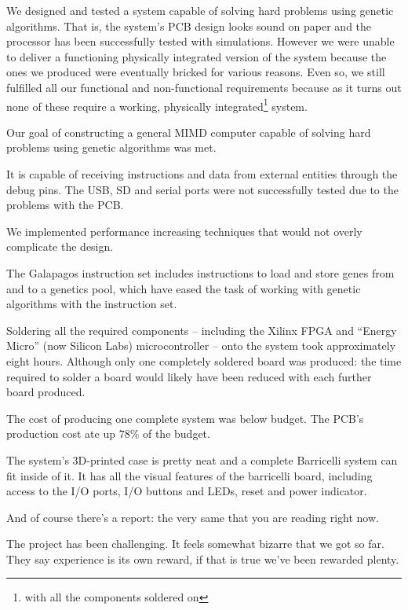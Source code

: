 We designed and tested a system capable of solving hard problems using genetic algorithms.
That is, the system's PCB design looks sound on paper and the processor has been successfully tested with simulations.
However we were unable to deliver a functioning physically integrated version of the system because the ones we produced were eventually bricked for various reasons.
Even so, we still fulfilled all our functional and non-functional requirements because as it turns out none of these require a working, physically integrated\footnote{with all the components soldered on} system.

Our goal of constructing a general MIMD computer capable of solving hard problems using genetic algorithms was met.

It is capable of receiving instructions and data from external entities through the debug pins.
The USB, SD and serial ports were not successfully tested due to the problems with the PCB.

We implemented performance increasing techniques that would not overly complicate the design.

The Galapagos instruction set includes instructions to load and store genes from and to a genetics pool, which have eased the task of working with genetic algorithms with the instruction set.

Soldering all the required components -- including the Xilinx FPGA and ``Energy Micro'' (now Silicon Labs) microcontroller --  onto the system took approximately eight hours.
Although only one completely soldered board was produced: the time required to solder a board would likely have been reduced with each further board produced.

The cost of producing one complete system was below budget.
The PCB's production cost ate up $78\%$ of the budget.

The system's 3D-printed case is pretty neat and a complete Barricelli system can fit inside of it. 
It has all the visual features of the barricelli board, including access to the I/O ports, I/O buttons and LEDs, reset and power indicator.

And of course there's a report: the very same that you are reading right now.

The project has been challenging.
It feels somewhat bizarre that we got so far.
They say experience is its own reward, if that is true we've been rewarded plenty.

